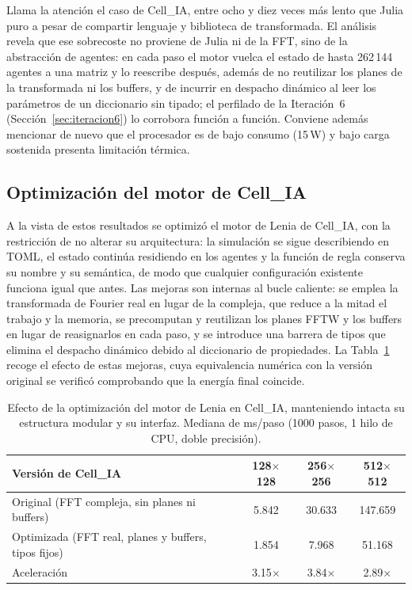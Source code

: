 \documentclass[runningheads]{llncs}
\begin{document}
Llama la atención el caso de Cell\_IA, entre ocho y diez veces más lento que Julia puro a pesar de compartir lenguaje y biblioteca de transformada. El análisis revela que ese sobrecoste no proviene de Julia ni de la FFT, sino de la abstracción de agentes: en cada paso el motor vuelca el estado de hasta 262\,144 agentes a una matriz y lo reescribe después, además de no reutilizar los planes de la transformada ni los buffers, y de incurrir en despacho dinámico al leer los parámetros de un diccionario sin tipado; el perfilado de la Iteración~6 (Sección~\ref{sec:iteracion6}) lo corrobora función a función. Conviene además mencionar de nuevo que el procesador es de bajo consumo (15\,W) y bajo carga sostenida presenta limitación térmica.

\subsection{Optimización del motor de Cell\_IA}
\label{sec:optimizacion_cellia}
A la vista de estos resultados se optimizó el motor de Lenia de Cell\_IA, con la restricción de no alterar su arquitectura: la simulación se sigue describiendo en TOML, el estado continúa residiendo en los agentes y la función de regla conserva su nombre y su semántica, de modo que cualquier configuración existente funciona igual que antes. Las mejoras son internas al bucle caliente: se emplea la transformada de Fourier real en lugar de la compleja, que reduce a la mitad el trabajo y la memoria, se precomputan y reutilizan los planes FFTW y los buffers en lugar de reasignarlos en cada paso, y se introduce una barrera de tipos que elimina el despacho dinámico debido al diccionario de propiedades. La Tabla~\ref{tab:optimizacion_cellia} recoge el efecto de estas mejoras, cuya equivalencia numérica con la versión original se verificó comprobando que la energía final coincide.

\begin{table}[H]
\centering
\caption{Efecto de la optimización del motor de Lenia en Cell\_IA, manteniendo intacta su estructura modular y su interfaz. Mediana de ms/paso (1000 pasos, 1 hilo de CPU, doble precisión).}
\label{tab:optimizacion_cellia}
\begin{tabular}{@{}lccc@{}}
\toprule
\textbf{Versión de Cell\_IA} & \textbf{128$\times$128} & \textbf{256$\times$256} & \textbf{512$\times$512} \\ \midrule
Original (FFT compleja, sin planes ni buffers)        & 5.842 & 30.633 & 147.659 \\
Optimizada (FFT real, planes y buffers, tipos fijos)  & 1.854 & 7.968  & 51.168  \\ \midrule
Aceleración                                           & 3.15$\times$ & 3.84$\times$ & 2.89$\times$ \\ \bottomrule
\end{tabular}
\end{table}
\end{document}

